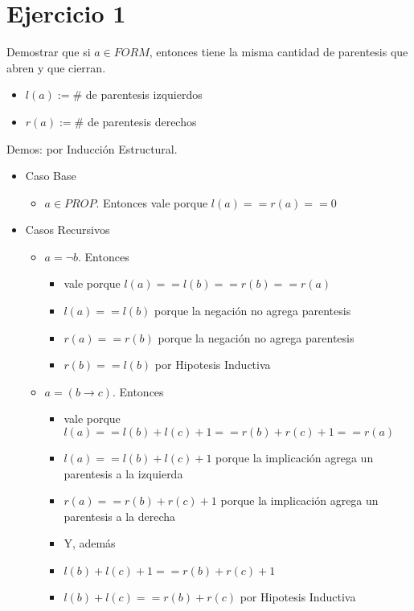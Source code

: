 \documentclass[14pt,a4paper,fleqn]{article}
\newcommand{\implica}[2]{(#1 \rightarrow #2)}
\newcommand{\no}[1]{\neg #1}
\begin{document}
\section*{Ejercicio 1}
Demostrar que si $a \in FORM$, entonces tiene la misma cantidad de parentesis que abren y que cierran.
\begin{itemize}
	\item $l(a) := \#$ de parentesis izquierdos
	\item $r(a) := \#$ de parentesis derechos	
\end{itemize}
Demos: por Inducción Estructural.
\begin{itemize}
	\item Caso Base
		\begin{itemize}
			\item $a \in PROP$. Entonces vale porque $ l(a) == r(a) == 0$
		\end{itemize}
	\item Casos Recursivos
		\begin{itemize}
			\item $a = \no{b}$. Entonces 
			\begin{itemize}
				\item vale porque $ l(a) == l(b) == r(b) == r(a)$
				\item $l(a) == l(b)$ porque la negación no agrega parentesis
				\item $r(a) == r(b)$ porque la negación no agrega parentesis
				\item $r(b) == l(b)$ por Hipotesis Inductiva
			\end{itemize}
			\item $a = \implica{b}{c}$. Entonces
			\begin{itemize}
				\item vale porque $ l(a) == l(b) + l(c) + 1 == r(b) + r(c) + 1 == r(a)$
				\item $l(a) == l(b) + l(c) + 1$ porque la implicación agrega un parentesis a la izquierda
				\item $r(a) == r(b) + r(c) + 1$ porque la implicación agrega un parentesis a la derecha
				\item Y, además
				\item $l(b) + l(c) + 1 == r(b) + r(c) + 1$
				\item $l(b) + l(c) == r(b) + r(c)$ por Hipotesis Inductiva
			\end{itemize}
		\end{itemize}
\end{itemize}
\end{document}
